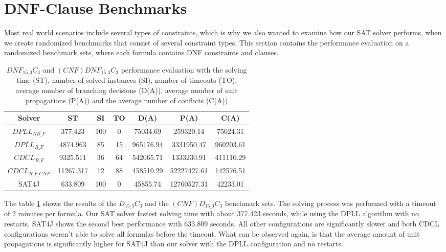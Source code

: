 \section{DNF-Clause Benchmarks}

Most real world scenarios include several types of constraints, which is why we also wanted to examine how our SAT solver performs, when we create randomized benchmarks that consist of several constraint types. This section contains the performance evaluation on a randomized benchmark sets, where each formula contains DNF constraints and clauses.


\begin{table}[!htb]
\centering
\caption[$DNF_{15\_3}C_3$ and $(CNF)DNF_{15\_3}C_3$ performance evaluation]{$DNF_{15\_3}C_3$ and $(CNF)DNF_{15\_3}C_3$ performance evaluation with the solving time (ST), number of solved instances (SI), number of timeouts (TO), average number of branching decisions (D(A)), average number of unit propagations (P(A)) and the average number of conflicts (C(A))}
\label{tab:dnfClauseBenchmarkSAT}
\begin{tabular}{|c|c|c|c|c|c|c|}
\hline
Solver & ST & SI & TO & D(A) & P(A) & C(A)\\ 
\hline
$DPLL_{NR\_F}$ & 377.423 & 100 & 0 & 75034.69 & 259320.14 & 75024.31 \\ 
\hline
$DPLL_{R\_F}$ & 4874.963 & 85 & 15 & 965176.94 & 3331950.47 & 960203.61 \\ 
\hline
$CDCL_{R\_F}$ & 9325.511 & 36 & 64 & 542065.71 & 1333230.91 & 411110.29 \\ 
\hline
$CDCL_{R\_F\_CNF}$ & 11267.317 & 12 & 88 & 458510.29 & 52227427.61 & 142576.51 \\ 
\hline
SAT4J & 633.809 & 100 & 0 & 45855.74 & 12760527.31 & 42233.01 \\ 
\hline
\end{tabular}
\end{table}

The table \ref{tab:dnfClauseBenchmarkSAT} shows the results of the $D_{15\_3}C_3$ and the $(CNF)D_{15\_3}C_3$ benchmark sets. The solving process was performed with a timeout of 2 minutes per formula. Our SAT solver fastest solving time with about 377.423 seconds, while using the DPLL algorithm with no restarts. SAT4J shows the second best performance with 633.809 seconds. All other configurations are significantly slower and both CDCL configurations weren't able to solve all formulas before the timeout. What can be observed again, is that the average amount of unit propagations is significantly higher for SAT4J than our solver with the DPLL configuration and no restarts.

